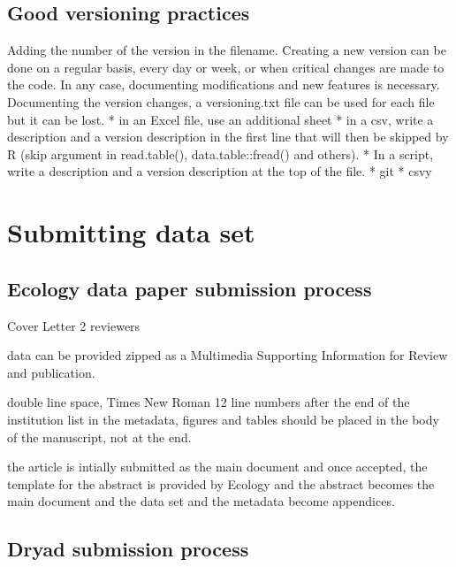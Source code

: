 \documentclass[
]{book}
\begin{document}
\hypertarget{good-versioning-practices}{%
\section{Good versioning practices}\label{good-versioning-practices}}

Adding the number of the version in the filename. Creating a new version can be done on a regular basis, every day or week, or when critical changes are made to the code. In any case, documenting modifications and new features is necessary.
Documenting the version changes, a versioning.txt file can be used for each file but it can be lost.
* in an Excel file, use an additional sheet
* in a csv, write a description and a version description in the first line that will then be skipped by R (skip argument in read.table(), data.table::fread() and others).
* In a script, write a description and a version description at the top of the file.
* git
* csvy

\hypertarget{submitting-data-set}{%
\chapter{Submitting data set}\label{submitting-data-set}}

\hypertarget{ecology-data-paper-submission-process}{%
\section{Ecology data paper submission process}\label{ecology-data-paper-submission-process}}

Cover Letter
2 reviewers

data can be provided zipped as a Multimedia Supporting Information for Review and publication.

double line space, Times New Roman 12
line numbers after the end of the institution list
in the metadata, figures and tables should be placed in the body of the manuscript, not at the end.

the article is intially submitted as the main document and once accepted, the template for the abstract is provided by Ecology and the abstract becomes the main document and the data set and the metadata become appendices.

\hypertarget{dryad-submission-process}{%
\section{Dryad submission process}\label{dryad-submission-process}}
\end{document}
